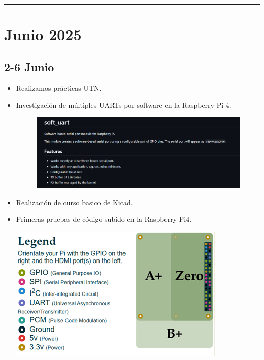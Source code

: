 \documentclass[12pt,a4paper]{article}
\newcommand{\separador}{\vspace{0.5cm}\noindent\rule{\linewidth}{0.5pt}\vspace{0.5cm}}
\begin{document}
\separador

\section*{Junio 2025}

\subsection*{2-6 Junio}
\begin{itemize}
\item Realizamos prácticas UTN.
\item Investigación de múltiples UARTs por software en la Raspberry Pi 4.

\begin{figure}[H]
    \centering
    \includegraphics[width=0.75\linewidth]{Carpeta de campo/Softuart.png}
\end{figure}

\item Realización de curso basico de Kicad.
\item Primeras pruebas de código subido en la Raspberry Pi4.

\includegraphics[width=0.7\linewidth]{Carpeta de campo/Imagen11.png}
\end{itemize}
\end{document}
